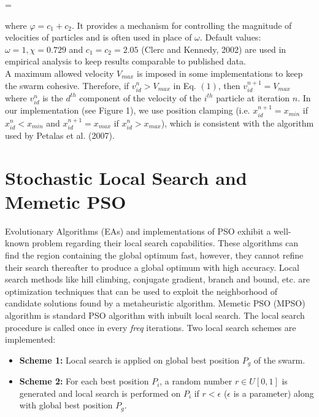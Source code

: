 \bea{}
\chi = 
\eea{}

where $\varphi = c_{1} + c_{2}$. It provides a mechanism for controlling the magnitude of velocities of particles and is often used in place of $\omega$. Default values: $\omega = 1, \chi = 0.729$ and $c_{1} = c_{2} = 2.05$ (Clerc and Kennedy, 2002) are used in empirical analysis to keep results comparable to published data.\\

A maximum allowed velocity $V_{max}$ is imposed in some implementations to keep the swarm cohesive. Therefore, if $v_{id}^{n} > V_{max}$ in Eq. $(1)$, then $v_{id}^{n+1} = V_{max}$ where $v_{id}^{n}$ is the $d^{th}$ component of the velocity of the $i^{th}$ particle at iteration $n$. In our implementation (see Figure 1), we use position clamping (i.e. $x_{id}^{n+1} = x_{min}$ if $x_{id}^{n} < x_{min}$ and $x_{id}^{n+1} = x_{max}$ if $x_{id}^{n} > x_{max}$), which is consistent with the algorithm used by Petalas et al. (2007).

\section{Stochastic Local Search and Memetic PSO}  

Evolutionary Algorithms (EAs) and implementations of PSO exhibit a well-known problem regarding their local search capabilities. These algorithms can find the region containing the global optimum fast, however, they cannot refine their search thereafter to produce a global optimum with high accuracy. Local search methods like hill climbing, conjugate gradient, branch and bound, etc. are optimization techniques that can be used to exploit the neighborhood of candidate solutions found by a metaheuristic algorithm. Memetic PSO (MPSO) algorithm is standard PSO algorithm with inbuilt local search. The local search procedure is called once in every {\it freq} iterations. Two local search schemes are implemented:

\begin{itemize}

\item[] {\bf Scheme 1:} Local search is applied on global best position $P_{g}$ of the swarm.

\item[] {\bf Scheme 2:} For each best position $P_{i}$, a random number $r \in U[0,1]$ is generated and local search is performed on $P_{i}$ if $r < \epsilon$ ($\epsilon$ is a parameter) along with global best position $P_{g}$.

\end{itemize}

